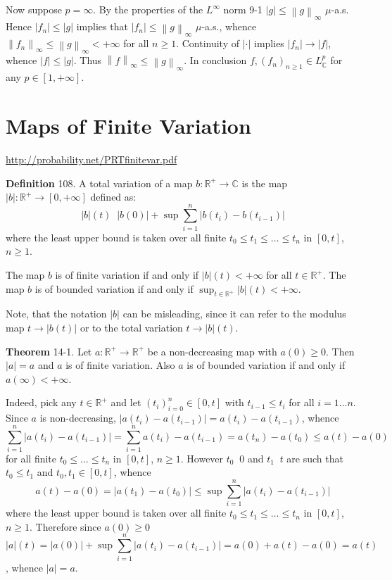 \documentclass[a4paper]{article}
\newcommand{\clo}[1]{\left [ #1 \right ]}
\newcommand{\brac}[1]{\left ( #1 \right )}
\newcommand{\abs}[1]{\left | #1 \right |}
\newcommand{\nrm}[1]{\left\| #1 \right \|}
\newcommand{\Real}{\mathbb{R}}
\newcommand{\Zinf}{\clo{ 0, +\infty }}
\newcommand{\Cplx}{\mathbb{C}}
\newcommand{\defn}{\mathop{\overset{\Delta}{=}}\nolimits}
\begin{document}
Now suppose $p=\infty$. By the properties of the $L^\infty$ norm 9-1 $\abs{g}\leq \nrm{g}_\infty$ $\mu$-a.s. Hence $\abs{f_n}\leq \abs{g}$ implies that $\abs{f_n}\leq \nrm{g}_\infty$ $\mu$-a.s., whence $\nrm{f_n}_\infty\leq \nrm{g}_\infty<+\infty$ for all $n\geq1$. Continuity of $\abs{\cdot}$ implies $\abs{f_n}\to \abs{f}$, whence $\abs{f}\leq \abs{g}$. Thus $\nrm{f}_\infty\leq \nrm{g}_\infty$. In conclusion $f,\brac{f_n}_{n\geq1}\in L^p_\Cplx$ for any $p\in \clo{1,+\infty}$.


\section{Maps of Finite Variation} %
\label{sec:tut_14}
\url{http://probability.net/PRTfinitevar.pdf}

\noindent\textbf{Definition} 108.
A total variation of a map $b:\Real^+\to \Cplx$ is the map $\abs{b}:\Real^+\to \Zinf$ defined as: \[\abs{b}\brac{t}\defn \abs{b\brac{0}}+\sup \sum_{i=1}^n \abs{b\brac{t_i} - b\brac{t_{i-1}}}\] where the least upper bound is taken over all finite $t_0\leq t_1\leq\ldots\leq t_n$ in $\clo{0,t}$, $n\geq1$.

The map $b$ is of finite variation if and only if $\abs{b}\brac{t}<+\infty$ for all $t\in \Real^+$. The map $b$ is of bounded variation if and only if $\sup_{t\in \Real^+}\abs{b}\brac{t}<+\infty$.

Note, that the notation $\abs{b}$ can be misleading, since it can refer to the modulus map $t\to\abs{b\brac{t}}$ or to the total variation $t\to \abs{b}\brac{t}$.

\label{thm:non_decr_bounded}\noindent \textbf{Theorem} 14-1.
Let $a:\Real^+\to\Real^+$ be a non-decreasing map with $a\brac{0}\geq0$. Then $\abs{a}=a$ and $a$ is of finite variation. Also $a$ is of bounded variation if and only if $a\brac{\infty}<+\infty$.

Indeed, pick any $t\in \Real^+$ and let $\brac{t_i}_{i=0}^n\in \clo{0,t}$ with $t_{i-1}\leq t_i$ for all $i=1\ldots n$. Since $a$ is non-decreasing, $\abs{a\brac{t_i}-a\brac{t_{i-1}}} = a\brac{t_i}-a\brac{t_{i-1}}$, whence \[\sum_{i=1}^n \abs{a\brac{t_i}-a\brac{t_{i-1}}} = \sum_{i=1}^n a\brac{t_i}-a\brac{t_{i-1}} = a\brac{t_n}-a\brac{t_0}\leq a\brac{t}-a\brac{0}\] for all finite $t_0\leq\ldots\leq t_n$ in $\clo{0,t}$, $n\geq1$. However $t_0\defn 0$ and $t_1\defn t$ are such that $t_0\leq t_1$ and $t_0,t_1\in \clo{0,t}$, whence \[a\brac{t}-a\brac{0} = \abs{a\brac{t_1}-a\brac{t_0}}\leq \sup\sum_{i=1}^n \abs{a\brac{t_i}-a\brac{t_{i-1}}}\] where the least upper bound is taken over all finite $t_0\leq t_1\leq\ldots\leq t_n$ in $\clo{0,t}$, $n\geq1$. Therefore since $a\brac{0}\geq0$ \[\abs{a}\brac{t}=\abs{a\brac{0}}+ \sup\sum_{i=1}^n \abs{a\brac{t_i}-a\brac{t_{i-1}}}=a\brac{0}+a\brac{t}-a\brac{0}=a\brac{t}\], whence $\abs{a} = a$.
\end{document}
